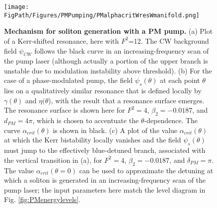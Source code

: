 \begin{figure}[htpb]
	\begin{center}
		\texttt{[image: \\FigPath/Figures/PMPumping/PMalphacritWresWmanifold.png]}
	\end{center}
	\caption[Mechanism for soliton generation with a PM pump]{\textbf{Mechanism for soliton generation with a PM pump.} (a) Plot of a Kerr-shifted resonance, here with $F^2$=12. The CW background field $\psi_{CW}$ follows the black curve in an increasing-frequency scan of the pump laser (although actually a portion of the upper branch is unstable due to modulation instability above threshold). (b) For the case of a phase-modulated pump, the field $\psi_s(\theta)$ at each point $\theta$ lies on a qualitatively similar resonance that is defined locally by $\gamma(\theta)$ and $\eta(\theta$), with the result that a resonance surface emerges. The resonance surface is shown here for $F^2=4$, $\beta_2=-0.0187$, and $d_{PM}=4\pi$, which is chosen to accentuate the $\theta$-dependence. The curve $\alpha_{crit}(\theta)$ is shown in black. (c) A plot of the value $\alpha_{crit}(\theta)$ at which the Kerr bistability locally vanishes and the field $\psi_s(\theta)$ must jump to the effectively blue-detuned branch, associated with the vertical transition in (a), for $F^2=4$, $\beta_2=-0.0187$, and $\delta_{PM}=\pi$. The value $\alpha_{crit}(\theta=0)$ can be used to approximate the detuning at which a soliton is generated in an increasing-frequency scan of the pump laser; the input parameters here match the level diagram in Fig. \ref{fig:PMenergylevels}.}
	\label{fig:PMalphacrit}
\end{figure} 


